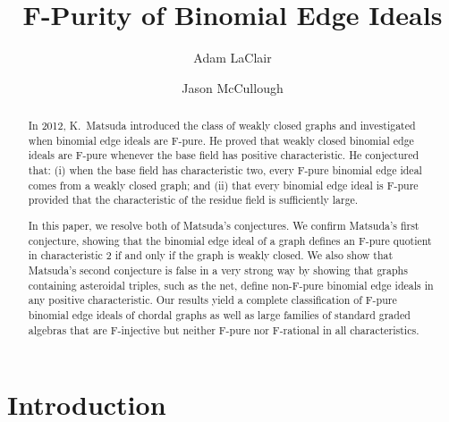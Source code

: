 \documentclass[12pt,a4paper]{amsart}
\theoremstyle{plain}
\theoremstyle{definition}
\theoremstyle{remark}
\begin{document}
\title{F-Purity of Binomial Edge Ideals}
\author[A. LaClair]{Adam LaClair}
\address{University of Nebraska-Lincoln, Department of Mathematics, Lincoln, NE, USA}
\author[J. McCullough]{Jason McCullough}
\address{Iowa State University, Department of Mathematics, Ames, IA, USA}



\begin{abstract}
In 2012, K.\ Matsuda introduced the class of weakly closed graphs and investigated when binomial edge ideals are F-pure. He proved that weakly closed binomial edge ideals are F-pure whenever the base field has positive characteristic. He conjectured that: (i) when the base field has characteristic two, every F-pure binomial edge ideal comes from a weakly closed graph; and (ii) that every binomial edge ideal is F-pure provided that the characteristic of the residue field is sufficiently large. 

In this paper, we resolve both of Matsuda's conjectures.  We confirm Matsuda's first conjecture, showing that the binomial edge ideal of a graph defines an F-pure quotient in characteristic 2 if and only if the graph is weakly closed.  We also show that Matsuda's second conjecture is false in a very strong way by showing that graphs containing asteroidal triples, such as the net, define non-F-pure binomial edge ideals in any positive characteristic.  Our results yield a complete classification of F-pure binomial edge ideals of chordal graphs as well as large families of standard graded algebras that are F-injective but neither F-pure nor F-rational in all characteristics. 
\end{abstract}


\maketitle 


\section{Introduction}
\end{document}
